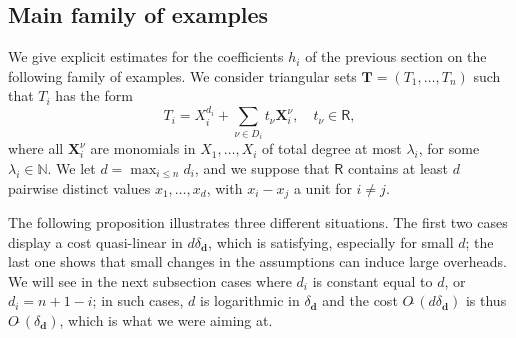 \documentclass[amsthm]{elsart}
\def\d {\ensuremath{\mathbf{d}}}
\def\N {\ensuremath{\mathbb{N}}}
\def\X {\ensuremath{\mathbf{X}}}
\def\T {\ensuremath{\mathbf{T}}}
\def\rng {\ensuremath{\mathsf{R}}}
\theoremstyle{plain}
\begin{document}
\subsection{Main family of examples}\label{ssec:main}

We give explicit estimates for the coefficients $h_i$ of the previous
section on the following family of examples. We consider triangular
sets $\T=(T_1,\dots,T_n)$ such that $T_i$ has the form
\begin{equation}\label{eq:ex2}
  T_i = X_i^{d_i} + \sum_{\nu \in D_i} t_\nu \X_i^\nu, \quad t_\nu \in \rng,
\end{equation}
where all $\X_i^\nu$ are monomials in $X_1,\dots,X_i$ of total degree
at most $\lambda_i$, for some $\lambda_i \in \N$. We let $d=\max_{i
  \le n} d_i$, and we suppose that $\rng$ contains at least $d$
pairwise distinct values $x_1,\dots,x_d$, with $x_i-x_j$ a unit for $i
\ne j$.

The following proposition illustrates three different situations. The
first two cases display a cost quasi-linear in $d\delta_\d$, which is
satisfying, especially for small $d$; the last one shows that small
changes in the assumptions can induce large overheads.  We will see in
the next subsection cases where $d_i$ is constant equal to $d$, or
$d_i=n+1-i$; in such cases, $d$ is logarithmic in $\delta_\d$ and the
cost $O\tilde{~}(d \delta_\d)$ is thus $O\tilde{~}(\delta_\d)$, which
is what we were aiming at.
\end{document}
